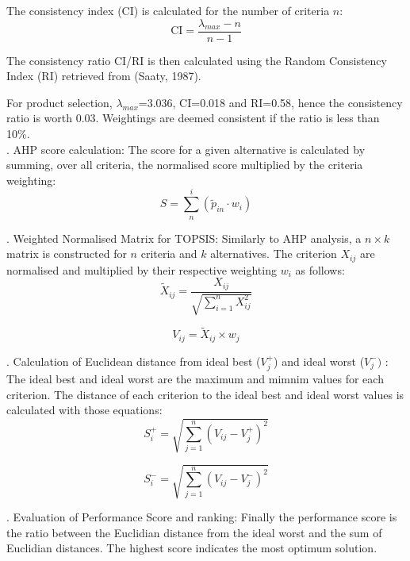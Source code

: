The consistency index (CI) is calculated for the number of criteria $n$:
\begin{equation}
   \mathrm{CI} = \frac{\lambda_{max}-n}{n-1}
\end{equation}

The consistency ratio CI/RI is then calculated using the Random Consistency Index (RI) retrieved from (Saaty, 1987). 

For product selection, $\lambda_{max}$=3.036, CI=0.018 and RI=0.58, hence the consistency ratio is worth 0.03. Weightings are deemed consistent if the ratio is less than 10\%.\\

. AHP score calculation: The score for a given alternative is calculated by summing, over all criteria, the normalised score multiplied by the criteria weighting:
\begin{equation}
    S=\sum^{i}_{n}(\tilde{p}_{in} \cdot w_{i})
\end{equation}

. Weighted Normalised Matrix for TOPSIS:
Similarly to AHP analysis, a $n\times k$ matrix is constructed for $n$ criteria and $k$ alternatives. The criterion $X_{ij}$ are normalised and multiplied by their respective weighting $w_i$ as follows:
\begin{equation}
    \tilde{X}_{ij}=\frac{X_{ij}}{\sqrt{\sum^{n}_{i=1}X_{ij}^{2}}}
\end{equation}

\begin{equation}
    V_{ij}=\tilde{X}_{ij}\times w_j
\end{equation}

. Calculation of Euclidean distance from ideal best ($V_{j}^{+}$) and ideal worst ($V_{j}^{-})$ :
The ideal best and ideal worst are the maximum and mimnim values for each criterion. The distance of each criterion to the ideal best and ideal worst values is calculated with those equations:
\begin{equation}
    S_{i}^{+}=\sqrt{\sum_{j=1}^{n}(V_{ij}-V_{j}^{+})^2}
\end{equation}

\begin{equation}
    S_{i}^{-}=\sqrt{\sum_{j=1}^{n}(V_{ij}-V_{j}^{-})^2}
\end{equation}

. Evaluation of Performance Score and ranking:
Finally the performance score is the ratio between the Euclidian distance from the ideal worst and the sum of Euclidian distances. The highest score indicates the most optimum solution.

